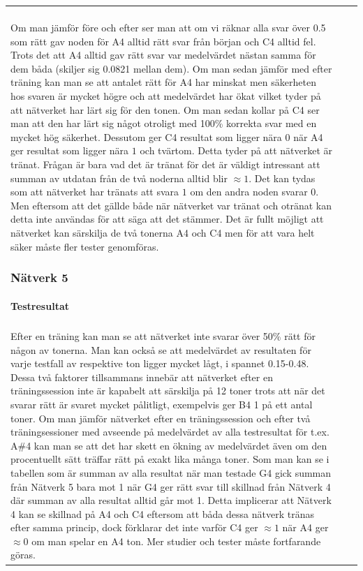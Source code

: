 \documentclass[a4paper,10pt]{article}
\begin{document}
{\begin{tabular}{ |l | l | l| }
\begin{centering}
\begin{centering}
\paragraph{Testresultat}\hspace{0pt}\\
Om man jämför före och efter ser man att om vi räknar alla svar över 0.5 som rätt gav noden för A4 alltid rätt svar från början och C4 alltid fel. Trots det att A4 alltid gav rätt svar var medelvärdet nästan samma för dem båda (skiljer sig 0.0821 mellan dem). Om man sedan jämför med efter träning kan man se att antalet rätt för A4 har minskat men säkerheten hos svaren är mycket högre och att medelvärdet har ökat vilket tyder på att nätverket har lärt sig för den tonen. Om man sedan kollar på C4 ser man att den har lärt sig något otroligt med 100\% korrekta svar med en mycket hög säkerhet. Dessutom ger C4 resultat som ligger nära $0$ när A4 ger resultat som ligger nära $1$ och tvärtom. Detta tyder på att nätverket är tränat. Frågan är bara vad det är tränat för det är väldigt intressant att summan av utdatan från de två noderna alltid blir $\approx 1$. Det kan tydas som att nätverket har tränats att svara $1$ om den andra noden svarar $0$. Men eftersom att det gällde både när nätverket var tränat och otränat kan detta inte användas för att säga att det stämmer. Det är fullt möjligt att nätverket kan särskilja de två tonerna A4 och C4 men för att vara helt säker måste fler tester genomföras.
\subsubsection{Nätverk 5}
\paragraph{Testresultat}\hspace{0pt}\\
Efter en träning kan man se att nätverket inte svarar över 50\% rätt för någon av tonerna. Man kan också se att medelvärdet av resultaten för varje testfall av respektive ton ligger mycket lågt, i spannet 0.15-0.48. Dessa två faktorer tillsammans innebär att nätverket efter en träningssession inte är kapabelt att särskilja på 12 toner trots att när det svarar rätt är svaret mycket pålitligt, exempelvis ger B4 1 på ett antal toner. 
Om man jämför nätverket efter en träningssession och efter två träningsessioner med avseende på medelvärdet av alla testresultat för t.ex. A\#4 kan man se att det har skett en ökning av medelvärdet även om den procentuellt sätt träffar rätt på exakt lika många toner. Som man kan se i tabellen som är summan av alla resultat när man testade G4 gick summan från Nätverk 5 bara mot 1 när G4 ger rätt svar till skillnad från Nätverk 4 där summan av alla resultat alltid går mot 1. Detta implicerar att Nätverk 4 kan se skillnad på A4 och C4 eftersom att båda dessa nätverk tränas efter samma princip, dock förklarar det inte varför C4 ger $\approx 1$ när A4 ger $\approx 0$ om man spelar en A4 ton. Mer studier och tester måste fortfarande göras.


\end{centering}
\end{centering}
\end{tabular}}
\end{document}
